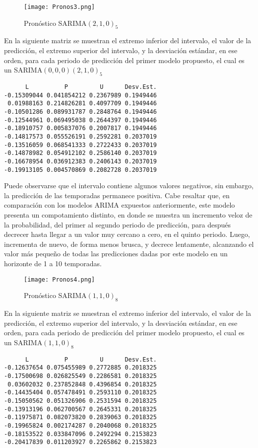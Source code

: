\documentclass{article}
\theoremstyle{remark}
\begin{document}
\begin{figure}[H] 
\centering
\texttt{[image: Pronos3.png]}
\caption{Pronóstico SARIMA\((2,1,0)_5\)}
\label{Pronos3}
\end{figure}
En la siguiente matriz se muestran el extremo inferior del intervalo, el valor de la predicción,  el extremo superior del intervalo, y la desviación estándar, en ese orden, para cada periodo de predicción del primer modelo propuesto, el cual es un SARIMA\((0,0,0)(2,1,0)_5\)
\begin{verbatim}
      L          P         U      Desv.Est.
-0.15309044 0.041854212 0.2367989 0.1949446
 0.01988163 0.214826281 0.4097709 0.1949446
-0.10501286 0.089931787 0.2848764 0.1949446
-0.12544961 0.069495038 0.2644397 0.1949446
-0.18910757 0.005837076 0.2007817 0.1949446
-0.14817573 0.055526191 0.2592281 0.2037019
-0.13516059 0.068541333 0.2722433 0.2037019
-0.14878982 0.054912102 0.2586140 0.2037019
-0.16678954 0.036912383 0.2406143 0.2037019
-0.19913105 0.004570869 0.2082728 0.2037019
\end{verbatim}
Puede observarse que el intervalo contiene algunos valores negativos, sin embargo, la predicción de las temporadas permanece positiva. Cabe resaltar que, en comparación con los modelos ARIMA expuestos anteriormente, este modelo presenta un compotamiento distinto, en donde se muestra un incremento veloz de la probabilidad, del primer al segundo periodo de predicción, para después decrecer hasta llegar a un valor muy cercano a cero, en el quinto periodo. Luego, incrementa de nuevo, de forma menos brusca, y decrece lentamente, alcanzando el valor más pequeño de todas las predicciones dadas por este modelo en un horizonte de 1 a 10 temporadas.
\begin{figure}[H] 
\centering
\texttt{[image: Pronos4.png]}
\caption{Pronóstico SARIMA\((1,1,0)_8\)}
\label{Pronos4}
\end{figure}
En la siguiente matriz se muestran el extremo inferior del intervalo, el valor de la predicción,  el extremo superior del intervalo, y la desviación estándar, en ese orden, para cada periodo de predicción del primer modelo propuesto, el cual es un SARIMA\((1,1,0)_8\)
\begin{verbatim}
      L          P         U      Desv.Est.
-0.12637654 0.075455989 0.2772885 0.2018325
-0.17500698 0.026825549 0.2286581 0.2018325
 0.03602032 0.237852848 0.4396854 0.2018325
-0.14435404 0.057478491 0.2593110 0.2018325
-0.15050562 0.051326906 0.2531594 0.2018325
-0.13913196 0.062700567 0.2645331 0.2018325
-0.11975871 0.082073820 0.2839063 0.2018325
-0.19965824 0.002174287 0.2040068 0.2018325
-0.18153522 0.033847096 0.2492294 0.2153823
-0.20417839 0.011203927 0.2265862 0.2153823
\end{verbatim}
\end{document}
